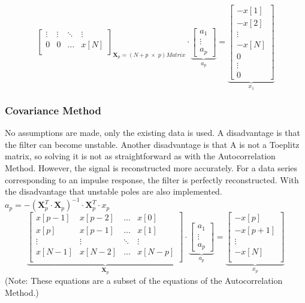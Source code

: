 \begin{enumerate}
$${\begin{bmatrix}
					\vdots & \vdots & \ddots & \vdots \\                     
					0 & 0 & \hdots & x[N] \\
				\end{bmatrix}  }_{\bm X_p=(N+p \; \times \; p) Matrix} \cdot \underbrace{\begin{bmatrix}
					a_1 \\
					\vdots \\
					a_p
				\end{bmatrix}  }_{a_p}= \underbrace{\begin{bmatrix}
					 -x [1]\\            
					 -x [2]\\
					\vdots \\
					 -x [N]\\
					0 \\
					\vdots \\
					0
				\end{bmatrix}}_{x_1} 
				 $$ \normalsize
			\end{enumerate}
			
		\subsubsection{Covariance Method  }
		No assumptions are made, only the existing data is used. A disadvantage is that the filter can become unstable. 
		Another disadvantage is that A is not a Toeplitz matrix, so solving it is not as straightforward as with the Autocorrelation Method. 
		However, the signal is reconstructed more accurately. For a data series corresponding to an impulse response, the filter is perfectly reconstructed. 
		With the disadvantage that unstable poles are also implemented. $a_p = -\left(\bm X_p^T \cdot \bm  X_p\right)^{-1} \cdot \bm X_p^T \cdot x_p$  \small
				$$
				\underbrace{\begin{bmatrix}               
					x[p-1] & x[p-2] & \hdots & x[0] \\                                   
					x[p] & x[p-1] & \hdots & x[1] \\      
					\vdots & \vdots & \ddots & \vdots \\                        
					x[N-1] & x[N-2] & \hdots & x[N-p] \\ 
				\end{bmatrix}  }_{\bm X_p} \cdot \underbrace{\begin{bmatrix}
					a_1 \\
					\vdots \\
					a_p
				\end{bmatrix}  }_{a_p}= \underbrace{\begin{bmatrix}
					 -x[p]\\            
					 -x[p+1]\\
					\vdots \\
					 -x[N]\\
				\end{bmatrix}}_{x_p}
				 $$ \normalsize
		(Note: These equations are a subset of the equations of the Autocorrelation Method.)


